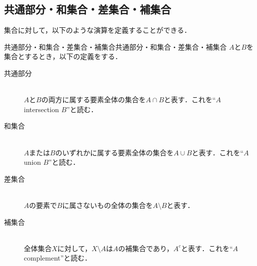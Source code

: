 \subsection{共通部分・和集合・差集合・補集合}
集合に対して，以下のような演算を定義することができる．

\begin{definition}{共通部分・和集合・差集合・補集合}{共通部分・和集合・差集合・補集合}
  $A$と$B$を集合とするとき，以下の定義をする．
  \begin{description}
    \item[共通部分]\mbox{}\\
          $A$と$B$の両方に属する要素全体の集合を$A \cap B$と表す．これを``$A$ intersection $B$''と読む．
    \item[和集合]\mbox{}\\
          $A$または$B$のいずれかに属する要素全体の集合を$A \cup B$と表す．これを``$A$ union $B$''と読む．
    \item[差集合]\mbox{}\\
          $A$の要素で$B$に属さないもの全体の集合を$A \setminus B$と表す．
    \item[補集合]\mbox{}\\
          全体集合$X$に対して，$X \setminus A$は$A$の補集合であり，$A^c$と表す．これを``$A$ complement''と読む．
  \end{description}
\end{definition}


